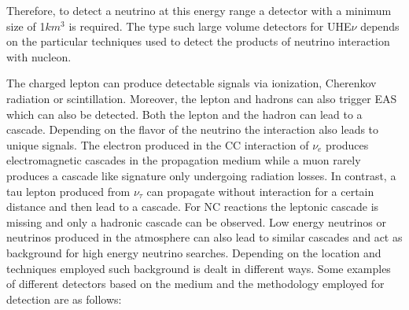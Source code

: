 Therefore, to detect a neutrino at this energy range a detector with a minimum size of 1$km^3$ is required. The type such large volume detectors for UHE$\nu$ depends on the particular techniques used to detect the products of neutrino interaction with nucleon. 


The charged lepton can produce detectable signals via ionization, Cherenkov radiation or scintillation. Moreover, the lepton and hadrons can also trigger EAS which can also be detected. Both the lepton and the hadron can lead to a cascade. Depending on the flavor of the neutrino the interaction also leads to unique signals. The electron produced in the CC interaction of $\nu_e$ produces electromagnetic cascades in the propagation medium while a muon rarely produces a cascade like signature only undergoing radiation losses. In contrast, a tau lepton produced from $\nu_{\tau}$ can propagate without interaction for a certain distance and then lead to a cascade. For NC reactions the leptonic cascade is missing and only a hadronic cascade can be observed. Low energy neutrinos or neutrinos produced in the atmosphere can also lead to similar cascades and act as background for high energy neutrino searches. Depending on the location and techniques employed such background is dealt in different ways. Some examples of different detectors based on the medium and the methodology employed for detection are as follows:

